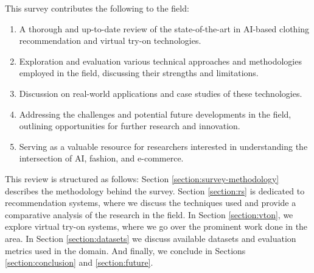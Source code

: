 	This survey contributes the following to the field:

	\begin{enumerate}
		\item A thorough and up-to-date review of the state-of-the-art in AI-based clothing recommendation and virtual try-on technologies.
		\item Exploration and evaluation various technical approaches and methodologies employed in the field, discussing their strengths and limitations.
		\item Discussion on real-world applications and case studies of these technologies.
		\item Addressing the challenges and potential future developments in the field, outlining opportunities for further research and innovation.
		\item Serving as a valuable resource for researchers interested in understanding the intersection of AI, fashion, and e-commerce.
	\end{enumerate}

	This review is structured as follows: Section \ref{section:survey-methodology} describes the methodology behind the survey. Section \ref{section:rs} is dedicated to recommendation systems, where we discuss the techniques used and provide a comparative analysis of the research in the field. In Section \ref{section:vton}, we explore virtual try-on systems, where we go over the prominent work done in the area. In Section \ref{section:datasets} we discuss available datasets and evaluation metrics used in the domain. And finally, we conclude in Sections \ref{section:conclusion} and \ref{section:future}.